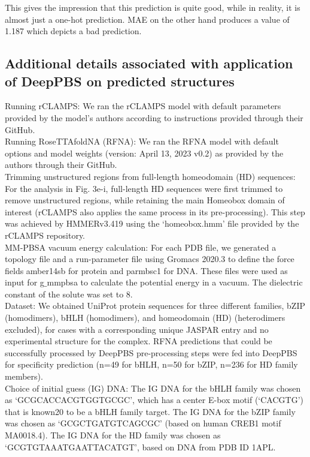 This gives the impression that this prediction is quite good, while in reality, it is almost just a one-hot prediction. MAE on the other hand produces a value of 1.187 which depicts a bad prediction.

\subsection{Additional details associated with application of DeepPBS on predicted structures}
Running rCLAMPS: We ran the rCLAMPS model with default parameters provided by the model’s authors according to instructions provided through their GitHub.
\\
Running RoseTTAfoldNA (RFNA): We ran the RFNA model with default options and model weights (version: April 13, 2023 v0.2) as provided by the authors through their GitHub.
\\
Trimming unstructured regions from full-length homeodomain (HD) sequences: For the analysis in Fig. 3e-i, full-length HD sequences were first trimmed to remove unstructured regions, while retaining the main Homeobox domain of interest (rCLAMPS also applies the same process in its pre-processing). This step was achieved by HMMERv3.419 using the ‘homeobox.hmm’ file provided by the rCLAMPS repository. 
\\
MM-PBSA vacuum energy calculation: For each PDB file, we generated a topology file and a run-parameter file using Gromacs 2020.3 to define the force fields amber14sb for protein and parmbsc1 for DNA. These files were used as input for g$\_$mmpbsa to calculate the potential energy in a vacuum. The dielectric constant of the solute was set to 8. 
\\
Dataset: We obtained UniProt protein sequences for three different families, bZIP (homodimers), bHLH (homodimers), and homeodomain (HD) (heterodimers excluded), for cases with a corresponding unique JASPAR entry and no experimental structure for the complex. RFNA predictions that could be successfully processed by DeepPBS pre-processing steps were fed into DeepPBS for specificity prediction (n=49 for bHLH, n=50 for bZIP, n=236 for HD family members).
\\
Choice of initial guess (IG) DNA: The IG DNA for the bHLH family was chosen as ‘GCGCACCACGTGGTGCGC’, which has a center E-box motif (‘CACGTG’) that is known20 to be a bHLH family target. The IG DNA for the bZIP family was chosen as ‘GCGCTGATGTCAGCGC’ (based on human CREB1 motif MA0018.4). The IG DNA for the HD family was chosen as ‘GCGTGTAAATGAATTACATGT’, based on DNA from PDB ID 1APL. 
